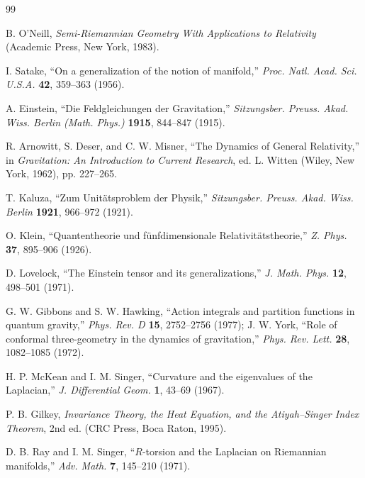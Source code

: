 \documentclass[11pt,a4paper]{article}
\theoremstyle{definition}
\theoremstyle{plain}
\theoremstyle{remark}
\begin{document}
\begin{thebibliography}{99}
\small

 B. O'Neill, \textit{Semi-Riemannian Geometry With Applications to Relativity} (Academic Press, New York, 1983).

 I. Satake, ``On a generalization of the notion of manifold,'' \textit{Proc. Natl. Acad. Sci. U.S.A.} \textbf{42}, 359--363 (1956).

 A. Einstein, ``Die Feldgleichungen der Gravitation,'' \textit{Sitzungsber. Preuss. Akad. Wiss. Berlin (Math. Phys.)} \textbf{1915}, 844--847 (1915).

 R. Arnowitt, S. Deser, and C. W. Misner, ``The Dynamics of General Relativity,'' in \textit{Gravitation: An Introduction to Current Research}, ed. L. Witten (Wiley, New York, 1962), pp. 227--265.

 T. Kaluza, ``Zum Unit\"atsproblem der Physik,'' \textit{Sitzungsber. Preuss. Akad. Wiss. Berlin} \textbf{1921}, 966--972 (1921).

 O. Klein, ``Quantentheorie und f\"unfdimensionale Relativit\"atstheorie,'' \textit{Z. Phys.} \textbf{37}, 895--906 (1926).

 D. Lovelock, ``The Einstein tensor and its generalizations,'' \textit{J. Math. Phys.} \textbf{12}, 498--501 (1971).

 G. W. Gibbons and S. W. Hawking, ``Action integrals and partition functions in quantum gravity,'' \textit{Phys. Rev. D} \textbf{15}, 2752--2756 (1977); J. W. York, ``Role of conformal three-geometry in the dynamics of gravitation,'' \textit{Phys. Rev. Lett.} \textbf{28}, 1082--1085 (1972).

 H. P. McKean and I. M. Singer, ``Curvature and the eigenvalues of the Laplacian,'' \textit{J. Differential Geom.} \textbf{1}, 43--69 (1967).

 P. B. Gilkey, \textit{Invariance Theory, the Heat Equation, and the Atiyah--Singer Index Theorem}, 2nd ed. (CRC Press, Boca Raton, 1995).

 D. B. Ray and I. M. Singer, ``$R$-torsion and the Laplacian on Riemannian manifolds,'' \textit{Adv. Math.} \textbf{7}, 145--210 (1971).


\end{thebibliography}
\end{document}
